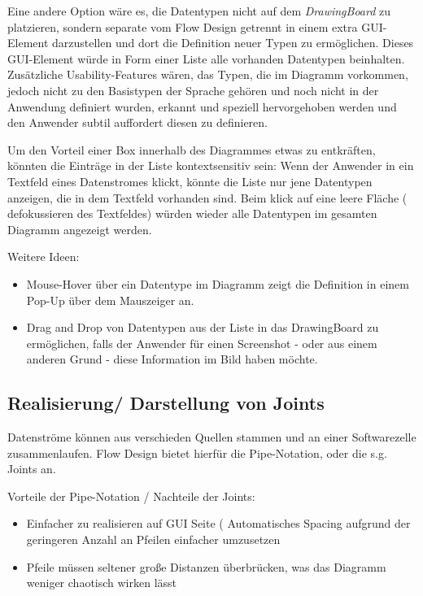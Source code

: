 Eine andere Option wäre es, die Datentypen nicht auf dem \textit{DrawingBoard} zu
platzieren, sondern separate vom Flow Design getrennt in einem extra GUI-Element
darzustellen und dort die Definition neuer Typen zu ermöglichen.
Dieses GUI-Element würde in Form einer Liste alle vorhanden Datentypen
beinhalten. Zusätzliche Usability-Features wären, das Typen, die im Diagramm
vorkommen, jedoch nicht zu den Basistypen der Sprache gehören und noch nicht in
der Anwendung definiert wurden, erkannt und speziell hervorgehoben werden und
den Anwender subtil auffordert diesen zu definieren.

Um den Vorteil einer Box innerhalb des Diagrammes etwas zu entkräften, könnten
die Einträge in der Liste kontextsensitiv sein: Wenn der Anwender in ein
Textfeld eines Datenstromes klickt, könnte die Liste nur jene Datentypen
anzeigen, die in dem Textfeld vorhanden sind. Beim klick auf eine leere Fläche (
defokussieren des Textfeldes) würden wieder alle Datentypen im gesamten Diagramm
angezeigt werden.

Weitere Ideen: 
\begin{itemize}
\item Mouse-Hover über ein Datentype im Diagramm zeigt die Definition in einem Pop-Up
über dem Mauszeiger an.
\item Drag and Drop von Datentypen aus der Liste in das DrawingBoard zu
ermöglichen, falls der Anwender für einen Screenshot - oder aus einem anderen
Grund - diese Information im Bild haben möchte.
\end{itemize}


\subsection{Realisierung/ Darstellung von Joints}

Datenströme können aus verschieden Quellen stammen und an einer Softwarezelle
zusammenlaufen. Flow Design bietet hierfür die Pipe-Notation, oder die s.g. Joints
an. 

Vorteile der Pipe-Notation / Nachteile der Joints:

\begin{itemize}
\item Einfacher zu realisieren auf GUI Seite ( Automatisches Spacing aufgrund der
geringeren Anzahl an Pfeilen einfacher umzusetzen
\item Pfeile müssen seltener große Distanzen überbrücken, was das Diagramm weniger
chaotisch wirken lässt
\end{itemize}

